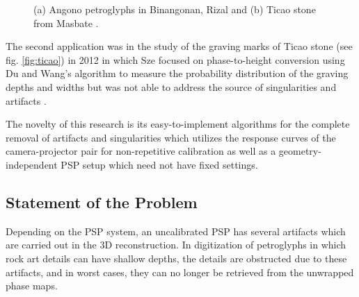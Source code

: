 \begin{figure}[h!]
	\centering
	\caption[Angono petroglyphs and Ticao stone]{(a) Angono petroglyphs in Binangonan, Rizal \cite{Vergara2010} and (b) Ticao stone from Masbate \cite{Sze2012}.}
	\label{fig:angonoticao}
\end{figure}

The second application was in the study of the graving marks of Ticao stone (see fig. \ref{fig:ticao}) in 2012 in which Sze focused on phase-to-height conversion using Du and Wang's algorithm to measure the probability distribution of the graving depths and widths but was not able to address the source of singularities and artifacts \cite{Sze2012}.

The novelty of this research is its easy-to-implement algorithms for the complete removal of artifacts and singularities which utilizes the response curves of the camera-projector pair for non-repetitive calibration as well as a geometry-independent PSP setup which need not have fixed settings.


\subsection{Statement of the Problem}

Depending on the PSP system, an uncalibrated PSP has several artifacts which are carried out in the 3D reconstruction. 
In digitization of petroglyphs in which rock art details can have shallow depths, the details are obstructed due to these artifacts, and in worst cases, they can no longer be retrieved from the unwrapped phase maps.

